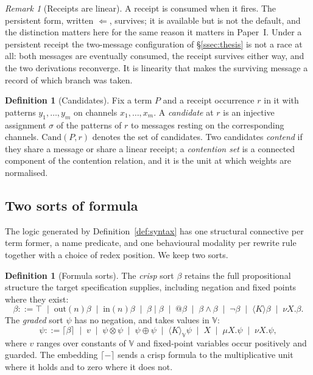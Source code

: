 \documentclass[11pt,a4paper]{article}
\theoremstyle{plain}
\theoremstyle{definition}
\newtheorem{definition}[theorem]{Definition}
\theoremstyle{remark}
\newtheorem{remark}[theorem]{Remark}
\newcommand{\V}{\mathbb{V}}
\newcommand{\tensorv}{\otimes}
\newcommand{\sumv}{\oplus}
\newcommand{\Cand}{\mathrm{Cand}}
\newcommand{\crisp}[1]{\lceil #1 \rceil}
\begin{document}
\begin{remark}[Receipts are linear]\label{rem:linear}
A receipt is consumed when it fires. The persistent form, written $\Leftarrow$,
survives; it is available but is not the default, and the distinction matters
here for the same reason it matters in Paper~I. Under a persistent receipt the
two-message configuration of \S\ref{ssec:thesis} is not a race at all: both
messages are eventually consumed, the receipt survives either way, and the two
derivations reconverge. It is linearity that makes the surviving message a record
of which branch was taken.
\end{remark}

\begin{definition}[Candidates]\label{def:cand}
Fix a term $P$ and a receipt occurrence $r$ in it with patterns
$y_1,\dots,y_m$ on channels $x_1,\dots,x_m$. A \emph{candidate} at $r$ is an
injective assignment $\sigma$ of the patterns of $r$ to messages resting on the
corresponding channels. $\Cand(P,r)$ denotes the set of candidates. Two
candidates \emph{contend} if they share a message or share a linear receipt; a
\emph{contention set} is a connected component of the contention relation, and it
is the unit at which weights are normalised.
\end{definition}

\subsection{Two sorts of formula}\label{ssec:sorts}

The logic generated by Definition~\ref{def:syntax} has one structural connective
per term former, a name predicate, and one behavioural modality per rewrite rule
together with a choice of redex position. We keep two sorts.

\begin{definition}[Formula sorts]\label{def:sorts}
The \emph{crisp} sort $\beta$ retains the full propositional structure the target
specification supplies, including negation and fixed points where they exist:
\[
\beta ::= \top \;\mid\; \mathrm{out}(n)\beta \;\mid\; \mathrm{in}(n)\beta
      \;\mid\; \beta \mid \beta \;\mid\; @\beta
      \;\mid\; \beta \wedge \beta \;\mid\; \neg\beta
      \;\mid\; \langle K\rangle\beta \;\mid\; \nu X.\beta .
\]
The \emph{graded} sort $\psi$ has no negation, and takes values in $\V$:
\[
\psi ::= \crisp{\beta} \;\mid\; v \;\mid\; \psi \tensorv \psi
      \;\mid\; \psi \sumv \psi \;\mid\; \langle K\rangle_{\V}\psi
      \;\mid\; X \;\mid\; \mu X.\psi \;\mid\; \nu X.\psi ,
\]
where $v$ ranges over constants of $\V$ and fixed-point variables occur
positively and guarded. The embedding $\crisp{-}$ sends a crisp formula to the
multiplicative unit where it holds and to zero where it does not.
\end{definition}
\end{document}
